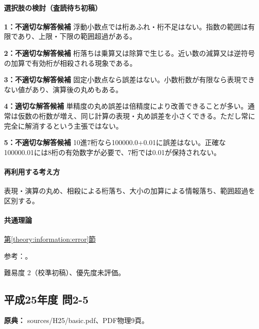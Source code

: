 \paragraph{選択肢の検討（査読待ち初稿）}\mbox{}\par

\noindent\textbf{1：不適切な解答候補} 浮動小数点では桁あふれ・桁不足はない。指数の範囲は有限であり、上限・下限の範囲超過がある。\par

\noindent\textbf{2：不適切な解答候補} 桁落ちは乗算又は除算で生じる。近い数の減算又は逆符号の加算で有効桁が相殺される現象である。\par

\noindent\textbf{3：不適切な解答候補} 固定小数点なら誤差はない。小数桁数が有限なら表現できない値があり、演算後の丸めもある。\par

\noindent\textbf{4：適切な解答候補} 単精度の丸め誤差は倍精度により改善できることが多い。通常は仮数の桁数が増え、同じ計算の表現・丸め誤差を小さくできる。ただし常に完全に解消するという主張ではない。\par

\noindent\textbf{5：不適切な解答候補} 10進7桁なら100000.0+0.01に誤差はない。正確な100000.01には8桁の有効数字が必要で、7桁では0.01が保持されない。\par

\paragraph{再利用する考え方} 表現・演算の丸め、相殺による桁落ち、大小の加算による情報落ち、範囲超過を区別する。

\paragraph{共通理論} \hyperref[theory:information:error]{第\ref*{theory:information:error}節}

\par 参考：\cite{goldberg1991}。

\par 難易度 2（校準初稿）、優先度未評価。

\subsection{平成25年度 問2-5}
\label{q:h25-reg-basic-2-5}

\noindent\textbf{原典：} sources/H25/basic.pdf、PDF物理9頁。

